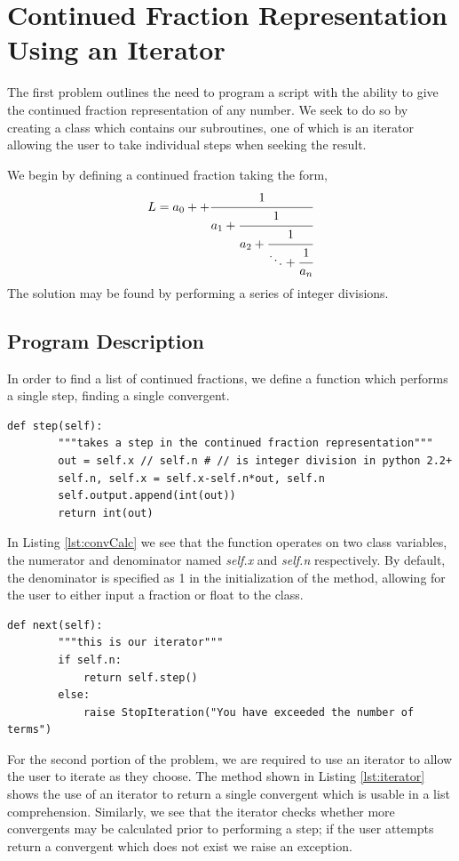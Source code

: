 \section{Continued Fraction Representation Using an Iterator} %
\label{sec:continued_fraction_representation_using_an_iterator}
The first problem outlines the need to program a script with the ability to give the continued fraction representation of any number. We seek to do so by creating a class which contains our subroutines, one of which is an iterator allowing the user to take individual steps when seeking the result.

We begin by defining a continued fraction taking the form,
\begin{equation}
    L = a_0 + + \cfrac{1}{a_1
              + \cfrac{1}{a_2
              + \cfrac{1}{\ddots
              + \cfrac{1}{a_n}}}}
\end{equation}
The solution may be found by performing a series of integer divisions.
\subsection{Program Description} %
\label{sub:program_description}
In order to find a list of continued fractions, we define a function which performs a single step, finding a single convergent.
\begin{lstlisting}[caption={Calculation of a single convergent}, label=lst:convCalc,firstnumber=8]
    def step(self):
        """takes a step in the continued fraction representation"""
        out = self.x // self.n # // is integer division in python 2.2+
        self.n, self.x = self.x-self.n*out, self.n
        self.output.append(int(out))
        return int(out)
\end{lstlisting}\noindent
In Listing \ref{lst:convCalc} we see that the function operates on two class variables, the numerator and denominator named \emph{self.x} and \emph{self.n} respectively. By default, the denominator is specified as 1 in the initialization of the method, allowing for the user to either input a fraction or float to the class. 
\begin{lstlisting}[caption={Class iterator}, label=lst:iterator,firstnumber=15]
    def next(self):
        """this is our iterator"""
        if self.n:
            return self.step()
        else:
            raise StopIteration("You have exceeded the number of terms")
\end{lstlisting}\noindent
For the second portion of the problem, we are required to use an iterator to allow the user to iterate as they choose. The method shown in Listing \ref{lst:iterator} shows the use of an iterator to return a single convergent which is usable in a list comprehension. Similarly, we see that the iterator checks whether more convergents may be calculated prior to performing a step; if the user attempts return a convergent which does not exist we raise an exception.

